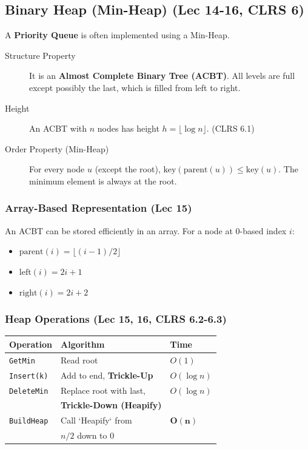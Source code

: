 \subsection{Binary Heap (Min-Heap) (Lec 14-16, CLRS 6)}
A \textbf{Priority Queue} is often implemented using a Min-Heap.
\begin{description}
    \item[Structure Property] It is an \textbf{Almost Complete Binary Tree (ACBT)}. All levels are full except possibly the last, which is filled from left to right.
    \item[Height] An ACBT with $n$ nodes has height $h = \lfloor \log n \rfloor$. (CLRS 6.1)
    \item[Order Property (Min-Heap)] For every node $u$ (except the root), $\text{key}(\text{parent}(u)) \le \text{key}(u)$. The minimum element is always at the root.
\end{description}

\subsubsection{Array-Based Representation (Lec 15)}
An ACBT can be stored efficiently in an array. For a node at 0-based index $i$:
\begin{itemize}
    \item $\text{parent}(i) = \lfloor (i-1) / 2 \rfloor$
    \item $\text{left}(i) = 2i + 1$
    \item $\text{right}(i) = 2i + 2$
\end{itemize}

\subsubsection{Heap Operations (Lec 15, 16, CLRS 6.2-6.3)}
\begin{tabular}{l l l}
    \textbf{Operation} & \textbf{Algorithm} & \textbf{Time} \\
    \hline
    \texttt{GetMin} & Read root & $O(1)$ \\
    \texttt{Insert(k)} & Add to end, \textbf{Trickle-Up} & $O(\log n)$ \\
    \texttt{DeleteMin} & Replace root with last, & $O(\log n)$ \\
     & \textbf{Trickle-Down (Heapify)} & \\
    \texttt{BuildHeap} & Call `Heapify` from & $\mathbf{O(n)}$ \\
     & $n/2$ down to 0 & \\
    \hline
\end{tabular}

